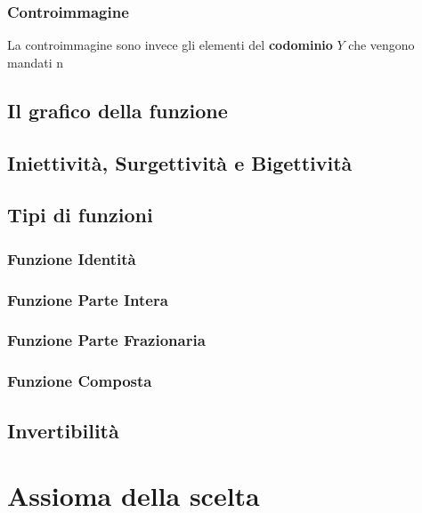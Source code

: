 \documentclass{article}
\begin{document}
\subsubsection{Controimmagine}
La controimmagine sono invece gli elementi del \textbf{codominio} $ Y $ che vengono mandati n  


\subsection{Il grafico della funzione}


\subsection{Iniettività, Surgettività e Bigettività}
\subsection{Tipi di funzioni}
\subsubsection{Funzione Identità}
\subsubsection{Funzione Parte Intera}
\subsubsection{Funzione Parte Frazionaria}
\subsubsection{Funzione Composta}


\subsection{Invertibilità}

\newpage
\section{Assioma della scelta}



\newpage
\end{document}
